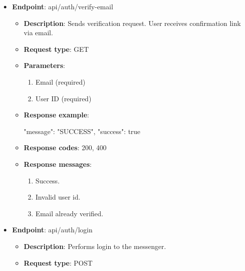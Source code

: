 \begin{itemize}
    \item \textbf{Endpoint}: api/auth/verify-email

    \begin{itemize}

        \item \textbf{Description}: Sends verification request.
        User receives confirmation link via email.

        \item \textbf{Request type}: GET

        \item \textbf{Parameters}:

        \begin{enumerate}
            \item Email (required)
            \item User ID (required)
        \end{enumerate}

        \item \textbf{Response example}:

        \begin{spverbatim}
        {
            "message": "SUCCESS",
            "success": true
        }
        \end{spverbatim}

        \item \textbf{Response codes}: 200, 400

        \item \textbf{Response messages}:
        \begin{enumerate}
            \item Success.
            \item Invalid user id.
            \item Email already verified.
        \end{enumerate}

    \end{itemize}

    \item \textbf{Endpoint}: api/auth/login

    \begin{itemize}

        \item \textbf{Description}: Performs login to the messenger.

        \item \textbf{Request type}: POST


\end{itemize}
\end{itemize}
